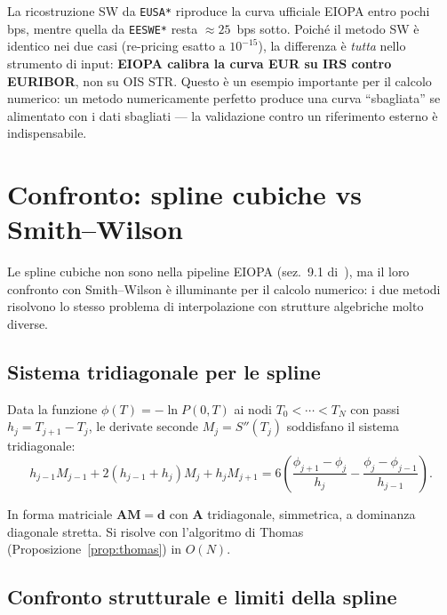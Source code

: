 \documentclass[11pt,a4paper]{article}
\theoremstyle{plain}
\theoremstyle{definition}
\theoremstyle{remark}
\begin{document}
\begin{keybox}
La ricostruzione SW da \texttt{EUSA*} riproduce la curva ufficiale EIOPA entro pochi bps,
mentre quella da \texttt{EESWE*} resta $\approx 25$~bps sotto. Poich\'e il metodo SW \`e
identico nei due casi (re-pricing esatto a $10^{-15}$), la differenza \`e \emph{tutta}
nello strumento di input: \textbf{EIOPA calibra la curva EUR su IRS contro EURIBOR}, non
su OIS \texteuro{}STR. Questo \`e un esempio importante per il calcolo numerico: un metodo
numericamente perfetto produce una curva ``sbagliata'' se alimentato con i dati sbagliati
--- la validazione contro un riferimento esterno \`e indispensabile.
\end{keybox}

\section{Confronto: spline cubiche vs Smith--Wilson}
\label{sec:confronto}

Le spline cubiche non sono nella pipeline EIOPA (sez.~9.1 di~\cite{eiopa2025}),
ma il loro confronto con Smith--Wilson \`e illuminante per il calcolo numerico:
i due metodi risolvono lo stesso problema di interpolazione con strutture
algebriche molto diverse.

\subsection{Sistema tridiagonale per le spline}

Data la funzione $\phi(T) = -\ln P(0,T)$ ai nodi $T_0 < \cdots < T_N$
con passi $h_j = T_{j+1}-T_j$, le derivate seconde $M_j = S''(T_j)$ soddisfano
il sistema tridiagonale:
\begin{equation}
  \label{eq:spline_sys}
  h_{j-1}M_{j-1} + 2(h_{j-1}+h_j)M_j + h_j M_{j+1}
  = 6\!\left(\frac{\phi_{j+1}-\phi_j}{h_j} - \frac{\phi_j-\phi_{j-1}}{h_{j-1}}\right).
\end{equation}

In forma matriciale $\mathbf{A}\mathbf{M} = \mathbf{d}$ con $\mathbf{A}$
tridiagonale, simmetrica, a dominanza diagonale stretta. Si risolve con
l'algoritmo di Thomas (Proposizione~\ref{prop:thomas}) in $O(N)$.

\subsection{Confronto strutturale e limiti della spline}
\end{document}
